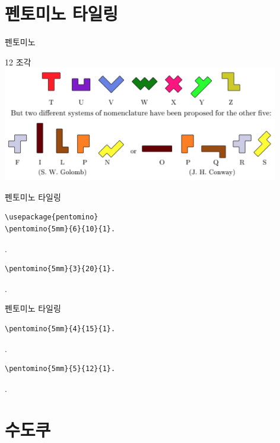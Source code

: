 \documentclass[xcolor=svgnames]{beamer}
\begin{document}
\section{펜토미노 타일링}

%
\begin{frame}{펜토미노}
  \begin{center}
  {\Large 12 조각} \\
  \includegraphics[height=5cm]{imgs/pentominoes.png}
  \end{center}
\end{frame}

%
\begin{frame}[fragile]{펜토미노 타일링}
\begin{verbatim}
\usepackage{pentomino}
\pentomino{5mm}{6}{10}{1}.
\end{verbatim}
\vspace{-5mm}
.
\vspace{-5mm}
\begin{verbatim}
\pentomino{5mm}{3}{20}{1}.
\end{verbatim}
\vspace{-5mm}
.
\end{frame}

%
\begin{frame}[fragile]{펜토미노 타일링}
\begin{verbatim}
\pentomino{5mm}{4}{15}{1}.
\end{verbatim}
\vspace{-5mm}
.
\vspace{-5mm}
\begin{verbatim}
\pentomino{5mm}{5}{12}{1}.
\end{verbatim}
\vspace{-5mm}
.
\end{frame}


\section{수도쿠}
\end{document}
